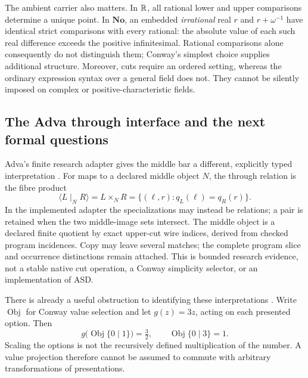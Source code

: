 The ambient carrier also matters.  In $\mathbb{R}$, all rational lower and upper
comparisons determine a unique point.  In $\mathbf{No}$, an embedded
\emph{irrational} real $r$ and $r+\omega^{-1}$ have identical strict
comparisons with every rational:
the absolute value of each such real difference exceeds the positive
infinitesimal.  Rational
comparisons alone consequently do not distinguish them; Conway's simplest
choice supplies additional structure.  Moreover, cuts require an ordered
setting, whereas the ordinary expression syntax over a general field does
not.  They cannot be silently imposed on complex or positive-characteristic
fields.

\subsection{The Adva through interface and the next formal questions}
\label{subsec:p0-cut-formal-programme}

Adva's finite research adapter gives the middle bar a different, explicitly
typed interpretation \cite{Adva2026GroundedThrough}.  For maps to a declared
middle object $N$, the through relation is the fibre product
\[
 \langle L\mid_N R\rangle=L\times_N R
   =\{(\ell,r):q_L(\ell)=q_R(r)\}.
\]
In the implemented adapter the specializations may instead be relations;
a pair is retained when the two middle-image sets intersect.  The middle
object is a declared finite quotient by exact upper-cut wire indices,
derived from checked program incidences.  Copy may leave several matches;
the complete program slice and occurrence distinctions remain attached.
This is bounded research evidence, not a stable native cut operation, a
Conway simplicity selector, or an implementation of ASD.

There is already a useful obstruction to identifying these interpretations
\cite{Adva2026CutObjectification}.  Write $\operatorname{Obj}$ for Conway
value selection and let $g(z)=3z$, acting on each presented option.  Then
\[
 g\bigl(\operatorname{Obj}\{0\mid1\}\bigr)=\tfrac32,
 \qquad
 \operatorname{Obj}\{0\mid3\}=1.
\]
Scaling the options is not the recursively defined multiplication of the
number.  A value projection therefore cannot be assumed to commute with
arbitrary transformations of presentations.

